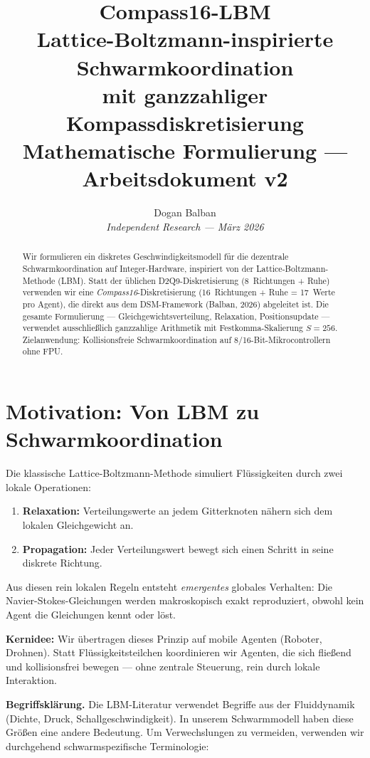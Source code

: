 \documentclass[11pt,a4paper]{article}
\title{\textbf{Compass16-LBM}\\[6pt]
\large Lattice-Boltzmann-inspirierte Schwarmkoordination\\
mit ganzzahliger Kompassdiskretisierung\\[12pt]
\normalsize Mathematische Formulierung --- Arbeitsdokument v2}
\author{Dogan Balban\\[4pt]
\small\textit{Independent Research --- M\"arz 2026}}
\date{}
\begin{document}
\maketitle

\begin{abstract}
\noindent Wir formulieren ein diskretes Geschwindigkeitsmodell f\"ur die dezentrale Schwarmkoordination
auf Integer-Hardware, inspiriert von der Lattice-Boltzmann-Methode (LBM).
Statt der \"ublichen D2Q9-Diskretisierung (8~Richtungen + Ruhe) verwenden wir eine
\textit{Compass16}-Diskretisierung (16~Richtungen + Ruhe = 17~Werte pro Agent),
die direkt aus dem DSM-Framework (Balban, 2026) abgeleitet ist.
Die gesamte Formulierung --- Gleichgewichtsverteilung, Relaxation, Positionsupdate ---
verwendet ausschlie\ss lich ganzzahlige Arithmetik mit Festkomma-Skalierung $S=256$.
Zielanwendung: Kollisionsfreie Schwarmkoordination auf 8/16-Bit-Mikrocontrollern ohne FPU.
\end{abstract}

\section{Motivation: Von LBM zu Schwarmkoordination}

Die klassische Lattice-Boltzmann-Methode simuliert Fl\"ussigkeiten durch zwei lokale Operationen:
\begin{enumerate}[itemsep=2pt]
\item \textbf{Relaxation:} Verteilungswerte an jedem Gitterknoten n\"ahern sich dem lokalen Gleichgewicht an.
\item \textbf{Propagation:} Jeder Verteilungswert bewegt sich einen Schritt in seine diskrete Richtung.
\end{enumerate}
Aus diesen rein lokalen Regeln entsteht \textit{emergentes} globales Verhalten:
Die Navier-Stokes-Gleichungen werden makroskopisch exakt reproduziert,
obwohl kein Agent die Gleichungen kennt oder l\"ost.

\textbf{Kernidee:} Wir \"ubertragen dieses Prinzip auf mobile Agenten (Roboter, Drohnen).
Statt Fl\"ussigkeitsteilchen koordinieren wir Agenten, die sich flie\ss end und kollisionsfrei
bewegen --- ohne zentrale Steuerung, rein durch lokale Interaktion.

\medskip
\noindent\textbf{Begriffsklärung.}
Die LBM-Literatur verwendet Begriffe aus der Fluiddynamik (Dichte, Druck, Schallgeschwindigkeit).
In unserem Schwarmmodell haben diese Gr\"o\ss en eine andere Bedeutung.
Um Verwechslungen zu vermeiden, verwenden wir durchgehend schwarmspezifische Terminologie:
\end{document}
